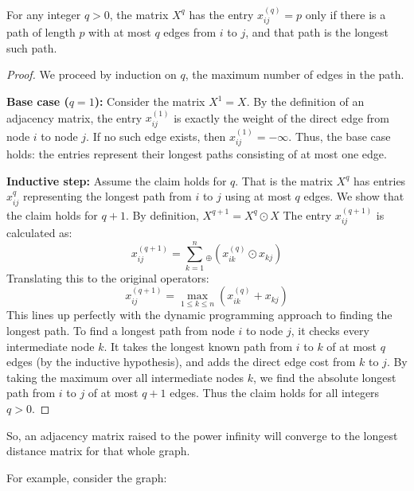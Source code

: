 \begin{theorem} \label{thm:mat-exp-longest-paths}

For any integer $q>0$, the matrix
$X^{q}$ has the entry $x_{ij}^{(q)} = p$ only if there is a path of length $p$ with at most $q$ edges from $i$ to $j$,
and that path is the longest such path.

\begin{proof}
  We proceed by induction on $q$, the maximum number of edges in the path.

  \textbf{Base case ($q = 1$):} Consider the matrix $X^1=X$. By the definition of an adjacency matrix, the entry  
  $x_{ij}^{(1)}$ is exactly the weight of the direct edge from node $i$ to node $j$. If no such edge exists, then 
  $x_{ij}^{(1)} = -\infty$. Thus, the base case holds: the entries represent their longest paths consisting of at most 
  one edge.

  \textbf{Inductive step:} Assume the claim holds for $q$. That is the matrix $X^{q}$ has entries $x_{ij}^{q}$ 
  representing the longest path from $i$ to $j$ using at most $q$ edges.
  We show that the claim holds for $q+1$. By definition, $X^{q+1} = X^{q} \odot X$
  The entry $x_{ij}^{(q+1)}$ is calculated as:
  $$x_{ij}^{(q+1)} = \sum_{k=1}^{n} \! {}_{\oplus} (x_{ik}^{(q)}\odot x_{kj})$$
  Translating this to the original operators:
  $$
  x_{ij}^{(q+1)} = \max_{1 \leq k \leq n} (x_{ik}^{(q)} + x_{kj})
  $$
  This lines up perfectly with the dynamic programming approach to finding the longest path. To find a longest path from
  node $i$ to node $j$, it checks every intermediate node $k$. It takes the longest known path from $i$ to $k$ of at most 
  $q$ edges (by the inductive hypothesis), and adds the direct edge cost from $k$ to $j$. By taking the maximum over all 
  intermediate nodes $k$, we find the absolute longest path from $i$ to $j$ of at most $q+1$ edges. Thus the claim holds 
  for all integers $q>0$.
\end{proof}

So, an adjacency matrix raised to the power infinity will converge to the longest distance matrix for that whole graph.
  
\end{theorem}


For example, consider the graph:
\begin{center}
\end{center}

